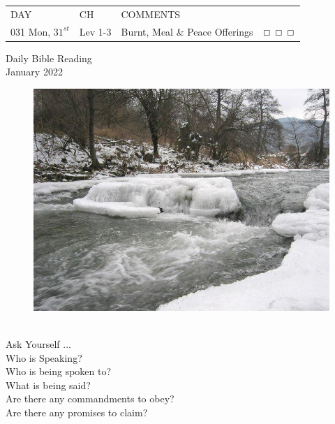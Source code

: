 \documentclass[10pt,landscape,twocolumn,letterpaper]{article}
\begin{document}
\begin{tabular}{p{0.7in}p{0.7in}p{1.8in}p{0.55in}}
  DAY & CH & COMMENTS &  \\
\tiny 031 \normalsize \textcolor[rgb]{0.00,0.00,1.00}{Mon, $31^{st}$} & \textcolor[rgb]{0.00,0.00,1.00}{Lev 1-3} &  \textcolor[rgb]{0.50,0.50,0.50}{\footnotesize Burnt, Meal \& Peace Offerings} & $\boxempty$ $\boxempty$ $\boxempty$\\
\end{tabular}






\newpage
\LARGE
\begin{center}
\textcolor[rgb]{0.98,0.00,0.00}{Daily Bible Reading}\\
\textcolor[rgb]{0.00,0.00,1.00}{January 2022}\\
\end{center}


\begin{figure}[htp]
    \centering
  \includegraphics[width=4.5in]{January.jpg}\\
\end{figure}

\begin{center}
\textcolor[rgb]{0.00,0.00,1.00}{\\Ask Yourself ...}
\textcolor[rgb]{1.00,0.00,0.00}{\\Who is Speaking?\\Who is being spoken to?\\What is being said?\\Are there
any commandments to obey?\\Are there any promises to claim?}
\end{center}
\end{document}
